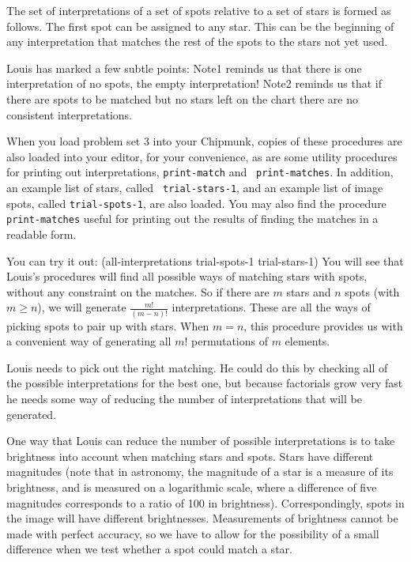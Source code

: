 The set of interpretations of a set of spots relative to a set of stars is
formed as follows.  The first spot can be assigned to any star.  This
can be the beginning of any interpretation that matches the rest of
the spots to the stars not yet used.

Louis has marked a few subtle points: Note1 reminds us that there is
one interpretation of no spots, the empty interpretation!  Note2
reminds us that if there are spots to be matched but no stars left on
the chart there are no consistent interpretations.

When you load problem set 3 into your Chipmunk, copies of these procedures are
also loaded into your editor, for your convenience, as are some utility
procedures for printing out interpretations, {\tt print-match} and {\tt
print-matches}.  In addition, an example list of stars, called {\tt
trial-stars-1}, and an example list of image spots, called {\tt trial-spots-1},
are also loaded.  You may also find the procedure {\tt print-matches} useful
for printing out the results of finding the matches in a readable form.

You can try it out:
\beginlisp
(all-interpretations trial-spots-1 trial-stars-1)
\endlisp
You will see that Louis's procedures will find all possible ways of
matching stars with spots, without any constraint on the matches.  So
if there are $m$ stars and $n$ spots (with $m\geq n$), we will
generate $\frac{m!}{(m-n)!}$ interpretations.  These are all the ways
of picking spots to pair up with stars.  When $m=n$, this procedure
provides us with a convenient way of generating all $m!$ permutations
of $m$ elements.

Louis needs to pick out the right matching.  He could do this by
checking all of the possible interpretations for the best one, but
because factorials grow very fast he needs some way of reducing the
number of interpretations that will be generated.

One way that Louis can reduce the number of possible interpretations
is to take brightness into account when matching stars and spots.
Stars have different magnitudes (note that in astronomy, the magnitude
of a star is a measure of its brightness, and is measured on a
logarithmic scale, where a difference of five magnitudes corresponds
to a ratio of 100 in brightness).  Correspondingly, spots in the image
will have different brightnesses.  Measurements of brightness cannot
be made with perfect accuracy, so we have to allow for the possibility
of a small difference when we test whether a spot could match a star.

